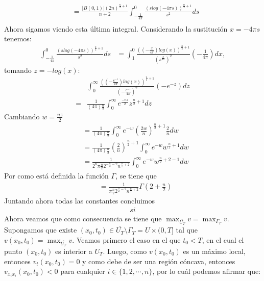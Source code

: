 \begin{homeworkProblem}
\begin{solucion}
\begin{align*}
      &= \frac{|B(0,1)|(2n)^{\frac{n}{2} + 1}}{n+2} \int_{-\frac{1}{4\pi}}^{0} \frac{(slog(-4\pi s))^{\frac{n}{2} + 1}}{s^{2}} ds\\ 
    \end{align*}
    Ahora sigamos viendo esta última integral. Considerando la sustitución $x = -4\pi s$ tenemos:
    \begin{align*}
      \int_{-\frac{1}{4\pi}}^{0} \frac{(slog(-4\pi s))^{\frac{n}{2} + 1}}{s^{2}} ds &= \int_{1}^{0} \frac{((-\frac{x}{4\pi})log(x))^{\frac{n}{2}+1}}{(s^\frac{x}{4\pi})^{2}}(- \frac{1}{4\pi})dx,
    \end{align*}
    tomando $z = -log(x)$:
    \begin{align*}
      &\int_{0}^{\infty} \frac{((-\frac{e^{-z}}{4\pi})log(x))^{\frac{n}{2}+1}}{(-\frac{e^{-z}}{4\pi})^{2}}(-e^{-z})dz\\
      =& \frac{1}{(4\pi){\frac{n}{2}}} \int_{0}^{\infty} e^{\frac{-nz}{2}}z^{\frac{n}{2}+1}dz
    \end{align*}
    Cambiando $w=\frac{nz}{2}$
    \begin{align*}
      &= \frac{1}{(4\pi){\frac{n}{2}}} \int_{0}^{\infty} e^{-w}(\frac{2w}{n})^{\frac{n}{2}+1}\frac{2}{n}dw\\ 
      &= \frac{1}{(4\pi){\frac{n}{2}}} (\frac{2}{n})^{\frac{n}{2}+1} \int_{0}^{\infty} e^{-w} w^{\frac{n}{2}+1}dw\\ 
      &= \frac{1}{2^{n} \pi{\frac{n}{2}} 2^{-\frac{n}{2}-2} n^{\frac{n}{2}+2}} \int_{0}^{\infty} e^{-w} w^{\frac{n}{2}+2-1}dw  
    \end{align*}
    Por como está definida la función $\Gamma$, se tiene que
    \begin{align*}
      &= \frac{1}{\pi{\frac{n}{2}} 2^{\frac{n}{2}-2} n^{\frac{n}{2}+2}} \Gamma (2 + \frac{n}{2})
    \end{align*}
    Juntando ahora todas las constantes concluimos
    \begin{align*}
      si
    \end{align*}
    \demostrado
    Ahora veamos que como consecuencia se tiene que $\max_{\overline{U_T}}v=\max_{\Gamma_T}v$.\\
    Supongamos que existe $(x_0,t_0)\in\overline{U_T}\setminus\Gamma_T=U\times (0,T]$ tal que $v(x_0,t_0)=\max_{\overline{U_T}}v$. Veamos primero el caso en el que $t_0<T$, en el cual el punto $(x_0,t_0)$ es interior a $U_T$. Luego, como $v(x_0,t_0)$ es un máximo local, entonces $v_t(x_0,t_0)=0$ y como debe de ser una región cóncava, entonces $v_{x_ix_i}(x_0,t_0)<0$ para cualquier $i\in\{1,2,\cdots,n\}$, por lo cuál podemos afirmar que:

\end{solucion}
\end{homeworkProblem}
